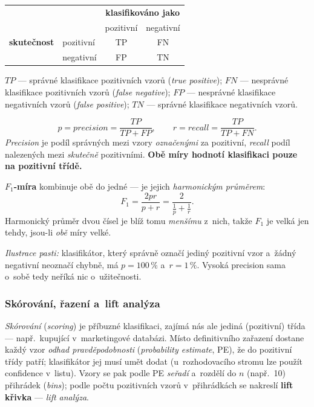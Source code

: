 \documentclass[11pt,a4paper]{article}
\theoremstyle{definition}
\begin{document}
\begin{defbox}
\begin{center}
\small
\begin{tabular}{@{}llcc@{}}
\toprule
& & \multicolumn{2}{c}{\textbf{klasifikováno jako}} \\
& & pozitivní & negativní \\
\midrule
\textbf{skutečnost} & pozitivní & TP & FN \\
                    & negativní & FP & TN \\
\bottomrule
\end{tabular}
\end{center}
$TP$ --- správné klasifikace pozitivních vzorů (\emph{true positive}); $FN$ --- nesprávné
klasifikace pozitivních vzorů (\emph{false negative}); $FP$ --- nesprávné klasifikace
negativních vzorů (\emph{false positive}); $TN$ --- správné klasifikace negativních vzorů.

\[ p=\mathit{precision}=\frac{TP}{TP+FP},\qquad r=\mathit{recall}=\frac{TP}{TP+FN}. \]
\emph{Precision} je podíl správných mezi vzory \emph{označenými} za pozitivní, \emph{recall}
podíl nalezených mezi \emph{skutečně} pozitivními. \textbf{Obě míry hodnotí klasifikaci pouze na
pozitivní třídě.}

\textbf{$F_1$-míra} kombinuje obě do jedné --- je jejich \emph{harmonickým průměrem}:
\[ F_1=\frac{2pr}{p+r}=\frac{2}{\frac1p+\frac1r}. \]
Harmonický průměr dvou čísel je blíž tomu \emph{menšímu} z~nich, takže $F_1$ je velká jen
tehdy, jsou-li \emph{obě} míry velké.
\end{defbox}

\emph{Ilustrace pasti:} klasifikátor, který správně označí jediný pozitivní vzor a~žádný
negativní neoznačí chybně, má $p=100\,\%$ a~$r=1\,\%$. Vysoká precision sama o~sobě tedy
neříká nic o~užitečnosti.

\subsubsection{Skórování, řazení a~lift analýza}

\emph{Skórování} (\emph{scoring}) je příbuzné klasifikaci, zajímá nás ale jediná (pozitivní)
třída --- např.\ kupující v~marketingové databázi. Místo definitivního zařazení dostane každý
vzor \emph{odhad pravděpodobnosti} (\emph{probability estimate}, PE), že do pozitivní třídy
patří; klasifikátor jej musí umět dodat (u~rozhodovacího stromu lze použít confidence v~listu).
Vzory se pak podle PE \emph{seřadí} a~rozdělí do $n$ (např.\ 10) přihrádek (\emph{bins}); podle
počtu pozitivních vzorů v~přihrádkách se nakreslí \textbf{lift křivka} --- \emph{lift analýza}.
\end{document}
